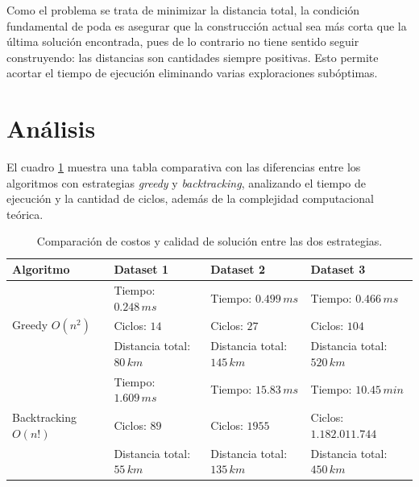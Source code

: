 \documentclass[10 pt, A4paper]{article}
\begin{document}
	Como el problema se trata de minimizar la distancia total, la condición fundamental de poda es asegurar que la construcción actual sea más corta que la última solución encontrada, pues de lo contrario no tiene sentido seguir construyendo: las distancias son cantidades siempre positivas. Esto permite acortar el tiempo de ejecución eliminando varias exploraciones subóptimas.
	
	\section*{Análisis}
	El cuadro \ref{table} muestra una tabla comparativa con las diferencias entre los algoritmos con estrategias \textit{greedy} y \textit{backtracking}, analizando el tiempo de ejecución y la cantidad de ciclos, además de la complejidad computacional teórica.
	
	\begin{table}[h!]
		\centering
		\begin{tabular}{|p{3.8cm} | p{3.5cm} | p{3.6cm} | p{3.6cm}|}
			\hline
			Algoritmo & Dataset 1 & Dataset 2 & Dataset 3 \\
			\hline
			\multirow{3}{1em}{Greedy $O(n^2)$} & Tiempo: $0.248\,ms$ & Tiempo: $0.499\,ms$& Tiempo: $0.466\,ms$ \\ & Ciclos: $14$ & Ciclos: $27$ & Ciclos: $104$ \\ & Distancia total: $80\,km$ & Distancia total: $145\,km$& Distancia total: $520\,km$ \\
			\hline
			\multirow{3}{1em}{Backtracking $O(n!)$} & Tiempo: $1.609\,ms$& Tiempo: $15.83\,ms$& Tiempo: $10.45\,min$\\ & Ciclos: $89$ & Ciclos: $1955$ & Ciclos: $1.182.011.744$ \\ & Distancia total: $55\,km$& Distancia total: $135\,km$& Distancia total: $450\,km$\\
			\hline
		\end{tabular}
		\caption{Comparación de costos y calidad de solución entre las dos estrategias.}
		\label{table}
	\end{table}
	
\end{document}
